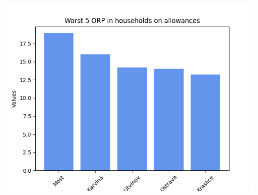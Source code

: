 \documentclass[a4paper, 12pt]{article}
\begin{document}
\begin{center}
    \includegraphics[width=.8\textwidth]{Worst 5 ORP in households on allowances.png}
\end{center}
\end{document}
